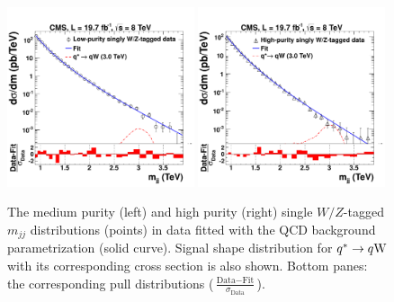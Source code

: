 \begin{figure}[th!b]
\begin{center}
\includegraphics[width=0.49\textwidth]{EXO-12-024/figs/MediumPuriqVFitAndPull.pdf}
\includegraphics[width=0.49\textwidth]{EXO-12-024/figs/HighPuriqVFitAndPull.pdf}
\end{center}
\caption{The medium purity (left) and high purity (right) single $W/Z$-tagged $m_{jj}$
  distributions (points) in data fitted with the QCD background parametrization (solid
  curve).  Signal shape distribution for $q^* \to q{\rm W}$
   with its corresponding cross section is also shown.  Bottom panes:
  the corresponding pull distributions ($\frac{\text{Data}-\text{Fit}}{\sigma_{\text{Data}}}$).  }
\label{fig:singleVtagBG}
\end{figure}

